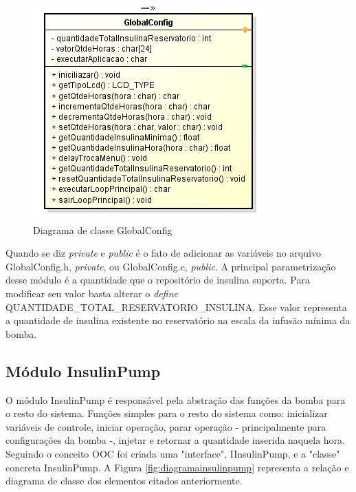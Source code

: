 \begin{figure}[htp]
	\centering
	\includegraphics[scale=1]{images/classe_GlobalConfig.png}
	\caption{Diagrama de classe GlobalConfig}	
	\label{fig:driagramaclasseconfig}
\end{figure}

Quando se diz \emph{private} e \emph{public} é o fato de adicionar as variáveis no arquivo GlobalConfig.h, \emph{private}, ou GlobalConfig.c, \emph{public}. A principal parametrização desse módulo é a quantidade que o repositório de insulina suporta. Para modificar seu valor basta alterar o \emph{define} QUANTIDADE\_TOTAL\_RESERVATORIO\_INSULINA. Esse valor representa a quantidade de insulina existente no reservatório na escala da infusão mínima da bomba.

\subsection{Módulo InsulinPump}

O módulo InsulinPump é responsável pela abstração das funções da bomba para o resto do sistema. Funções simples para o resto do sistema como: inicializar variáveis de controle, iniciar operação, parar operação - principalmente para configurações da bomba -, injetar e retornar a quantidade inserida naquela hora. Seguindo o conceito OOC foi criada uma "interface", IInsulinPump, e a "classe" concreta InsulinPump. A Figura \ref{fig:diagramainsulinpump} representa a relação e diagrama de classe dos elementos citados anteriormente.

